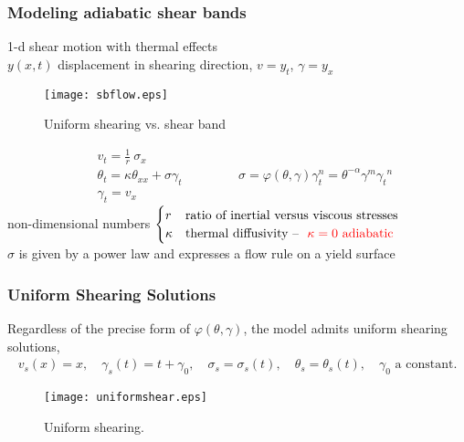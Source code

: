 \documentclass{beamer}
\def\red{\color{red}}
\def\blue{\color{blue}}
\begin{document}
\begin{frame}
\frametitle{Modeling adiabatic shear bands}

{\small 
1-d  {\blue shear motion} with {\red thermal effects}
\\
$y(x,t)$ displacement in shearing direction, $v = y_t$, $\gamma = y_x$
\\
 \begin{figure}
    \centering\texttt{[image: sbflow.eps]}
    \caption{{Uniform shearing }  \hspace{0.2cm}  {\blue vs.}  \hspace{0.2cm} {\red shear band}}
  \end{figure}
  
\vspace{-0.2cm}
\begin{equation*}
  \begin{aligned}
    & v_{t} = \frac{1}{r}\ \sigma_{x}
    \\
    & \theta_{t} = \kappa \theta_{ x x}  +  \sigma \gamma_{t}
     \\
    & \gamma_{t} = v_{x}
  \end{aligned}
  \qquad \qquad
  \sigma = \varphi(\theta,\gamma)\gamma_t^n=\theta^{-\alpha} \gamma^m {\gamma_t}^n
\end{equation*}
non-dimensional numbers 
$\begin{cases}
 r &  \text{ratio of inertial versus viscous stresses}
\\
\kappa & \text{thermal diffusivity -- \color{red}{  $\kappa = 0$ adiabatic }}
\end{cases}$
\\
$\sigma$ is given by a {\color{cyan} power law } and expresses a flow rule on a yield surface

 }

\end{frame}

\begin{frame}
 \frametitle{Uniform Shearing Solutions}
 Regardless of the precise form of $\varphi(\theta,\gamma)$, the model admits {\red uniform shearing solutions},
 \begin{align*}
  v_s(x) = x, \quad \gamma_s(t) = t + \gamma_0, \quad \sigma_s = \sigma_s(t), \quad \theta_s=\theta_s(t),\quad \text{$\gamma_0$ a constant}.
 \end{align*}
 
  \begin{figure}
    \center
    \texttt{[image: uniformshear.eps]}
    \caption{{\footnotesize Uniform shearing.}}
  \end{figure}
  
\end{frame}
\end{document}
